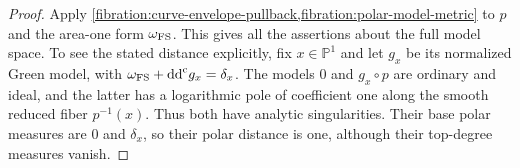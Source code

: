 \begin{proof}
Apply \cref{fibration:curve-envelope-pullback,fibration:polar-model-metric} to $p$ and the area-one form
$\omega_{\mathrm{FS}}$. This gives all the assertions about the full
model space. To see the stated distance explicitly, fix
$x\in\mathbb P^1$ and let $g_x$ be its normalized Green model,
with $\omega_{\mathrm{FS}}+\mathrm{dd}^{\mathrm{c}} g_x=\delta_x$. The models $0$ and
$g_x\circ p$ are ordinary and ideal, and the latter has a
logarithmic pole of coefficient one along the smooth reduced
fiber $p^{-1}(x)$. Thus both have analytic singularities. Their
base polar measures are $0$ and $\delta_x$, so their polar
distance is one, although their top-degree measures vanish.
\end{proof}
